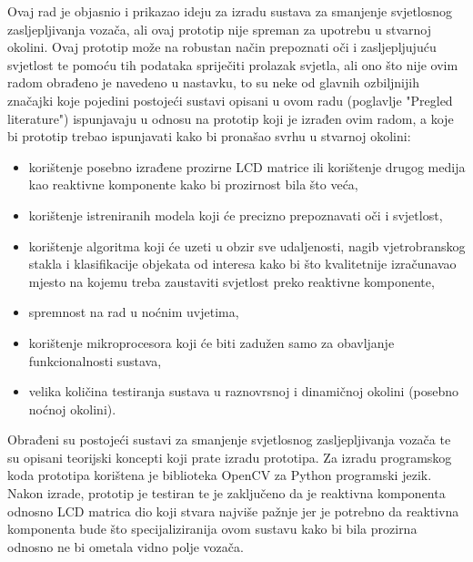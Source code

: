 \documentclass{foi}
\begin{document}
Ovaj rad je objasnio i prikazao ideju za izradu sustava za smanjenje svjetlosnog zasljepljivanja vozača, ali ovaj prototip nije spreman za upotrebu u stvarnoj okolini. Ovaj prototip može na robustan način prepoznati oči i zasljepljujuću svjetlost te pomoću tih podataka spriječiti prolazak svjetla, ali ono što nije ovim radom obrađeno je navedeno u nastavku, to su neke od glavnih ozbiljnijih značajki koje pojedini postojeći sustavi opisani u ovom radu (poglavlje "Pregled literature") ispunjavaju u odnosu na prototip koji je izrađen ovim radom, a koje bi prototip trebao ispunjavati kako bi pronašao svrhu u stvarnoj okolini:
\begin{itemize}[noitemsep]
    \item korištenje posebno izrađene prozirne LCD matrice ili korištenje drugog medija kao reaktivne komponente kako bi prozirnost bila što veća,
    \item korištenje istreniranih modela koji će precizno prepoznavati oči i svjetlost,
    \item korištenje algoritma koji će uzeti u obzir sve udaljenosti, nagib vjetrobranskog stakla i klasifikacije objekata od interesa kako bi što kvalitetnije izračunavao mjesto na kojemu treba zaustaviti svjetlost preko reaktivne komponente,
    \item spremnost na rad u noćnim uvjetima,
    \item korištenje mikroprocesora koji će biti zadužen samo za obavljanje funkcionalnosti sustava,
    \item velika količina testiranja sustava u raznovrsnoj i dinamičnoj okolini (posebno noćnoj okolini).
\end{itemize}

Obrađeni su postojeći sustavi za smanjenje svjetlosnog zasljepljivanja vozača te su opisani teorijski koncepti koji prate izradu prototipa. Za izradu programskog koda prototipa korištena je biblioteka OpenCV za Python programski jezik. Nakon izrade, prototip je testiran te je zaključeno da je reaktivna komponenta odnosno LCD matrica dio koji stvara najviše pažnje jer je potrebno da reaktivna komponenta bude što specijaliziranija ovom sustavu kako bi bila prozirna odnosno ne bi ometala vidno polje vozača.

\printbibliography[title=Popis literature]

\listoffigures
{}

\let\tableofcontents=\oldtableofcontents

\lstlistoflistings
{}
\end{document}
